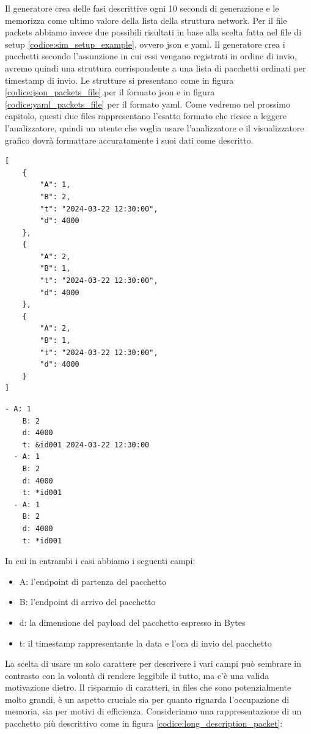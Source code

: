 \documentclass[binding=0.6cm]{sapthesis}
\begin{document}
Il generatore crea delle fasi descrittive ogni 10 secondi di generazione e le memorizza come ultimo valore della lista della struttura network.
Per il file packets abbiamo invece due possibili risultati in base alla scelta fatta nel file di setup \ref{codice:sim_setup_example}, ovvero json e yaml.
Il generatore crea i pacchetti secondo l'assunzione in cui essi vengano registrati in ordine di invio, avremo quindi una struttura corrispondente
a una lista di pacchetti ordinati per timestamp di invio.
Le strutture si presentano come in figura \ref{codice:json_packets_file} per il formato json e in figura \ref{codice:yaml_packets_file} per il formato yaml.
Come vedremo nel prossimo capitolo, questi due files rappresentano l'esatto formato che riesce a leggere l'analizzatore, quindi un utente
che voglia usare l'analizzatore e il visualizzatore grafico dovrà formattare accuratamente i suoi dati come descritto.

{\scriptsize %
\begin{lstlisting}[caption={Esempio di packets file in formato json}, label={codice:json_packets_file}]
[
    {
        "A": 1,
        "B": 2,
        "t": "2024-03-22 12:30:00",
        "d": 4000
    },
    {
        "A": 2,
        "B": 1,
        "t": "2024-03-22 12:30:00",
        "d": 4000
    },
    {
        "A": 2,
        "B": 1,
        "t": "2024-03-22 12:30:00",
        "d": 4000
    }
]
\end{lstlisting}
}

{\scriptsize %
\begin{lstlisting}[caption={Esempio di packets file in formato yaml}, label={codice:yaml_packets_file}]
  - A: 1
    B: 2
    d: 4000
    t: &id001 2024-03-22 12:30:00
  - A: 1
    B: 2
    d: 4000
    t: *id001
  - A: 1
    B: 2
    d: 4000
    t: *id001
\end{lstlisting}
}

In cui in entrambi i casi abbiamo i seguenti campi:
\begin{itemize}
    \item A: l'endpoint di partenza del pacchetto
    \item B: l'endpoint di arrivo del pacchetto
    \item d: la dimensione del payload del pacchetto espresso in Bytes
    \item t: il timestamp rappresentante la data e l'ora di invio del pacchetto
\end{itemize}
La scelta di usare un solo carattere per descrivere i vari campi può sembrare in contrasto con la volontà di rendere leggibile il tutto,
ma c'è una valida motivazione dietro. Il risparmio di caratteri, in files che sono potenzialmente molto grandi, è un aspetto cruciale sia per quanto
riguarda l'occupazione di memoria, sia per motivi di efficienza. Consideriamo una rappresentazione di un pacchetto più descrittivo come in figura \ref{codice:long_description_packet}:
\end{document}
